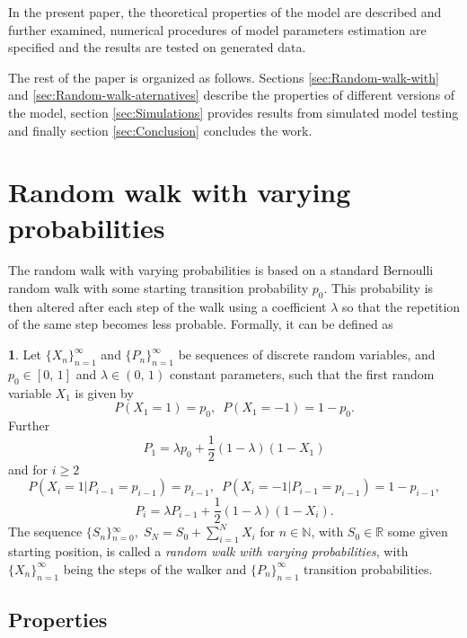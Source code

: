 \documentclass{amsart}
\theoremstyle{definition}
\newtheorem{defn}[thm]{\protect\definitionname}
\theoremstyle{plain}
\theoremstyle{plain}
\theoremstyle{plain}
\numberwithin{equation}{section}
\providecommand{\definitionname}{Definition}
\begin{document}
In the present paper, the theoretical properties of the model are
described and further examined, numerical procedures of model
parameters estimation are specified and the results are tested on
generated data.

The rest of the paper is organized as follows. Sections
\ref{sec:Random-walk-with} and \ref{sec:Random-walk-aternatives}
describe the properties of different versions of the model,
section \ref{sec:Simulations} provides results from simulated
model testing and finally section \ref{sec:Conclusion} concludes
the work.

\section{Random walk with varying probabilities\label{sec:Random-walk-with}}

The random walk with varying probabilities is based on a standard
Bernoulli random walk \cite{feller1957introduction} with some starting
transition probability $p_{0}$. This probability is then altered
after each step of the walk using a coefficient $\lambda$ so that
the repetition of the same step becomes less probable. Formally, it
can be defined as
\begin{defn}
\label{success_punished}Let ${\{X_{n}\}}_{n=1}^{\infty}$ and ${\{P_{n}\}}_{n=1}^{\infty}$
be sequences of discrete random variables, and $p_{0}\in[0,\,1]$
and $\lambda\in(0,\,1)$ constant parameters, such that the first
random variable $X_{1}$ is given by
\[
P(X_{1}=1)=p_{0},\,\,\,
P(X_{1}=-1)=1-p_{0}.
\]
Further
\begin{equation}
P_{1}=\lambda p_{0}+\frac{1}{2}(1-\lambda)(1-X_{1})\label{eq:P!1_def}
\end{equation}
and for $i\geq2$
\[
P(X_{i}=1|P_{i-1}=p_{i-1})=p_{i-1},\,\,\,
P(X_{i}=-1|P_{i-1}=p_{i-1})=1-p_{i-1},
\]
\begin{equation}
P_{i}=\lambda P_{i-1}+\frac{1}{2}(1-\lambda)(1-X_{i}).\label{eq:Pi_def}
\end{equation}
The sequence ${\{S_{n}\}}{}_{n=0}^{\infty},\;S_{N}=S_{0}+\sum_{i=1}^{N}X_{i}$
for $n\in\mathbb{N}$, with $S_{0}\in\mathbb{R}$ some given starting
position, is called a \emph{random walk with varying probabilities},
with ${\{X_{n}\}}_{n=1}^{\infty}$ being the steps of the walker and
${\{P_{n}\}}_{n=1}^{\infty}$ transition probabilities.
\end{defn}

\subsection{Properties}
\end{document}
